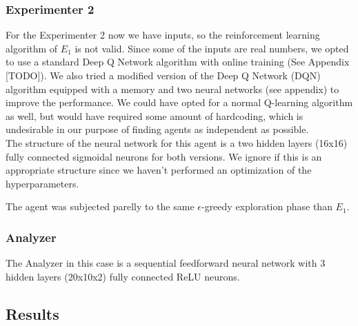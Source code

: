 \documentclass[11pt,a4paper,twoside]{report}
\newcommand{\+}{\textnormal{+} }
\theoremstyle{definition}
\numberwithin{equation}{chapter}
\begin{document}
\subsubsection{Experimenter 2}
For the Experimenter 2 now we have inputs, so the reinforcement learning
algorithm of $E_1$ is not valid. Since some of the inputs are real numbers, we
opted to use a standard Deep Q Network algorithm with online training (See
Appendix [TODO]). We also tried a modified version of the Deep Q Network (DQN)
algorithm equipped with a memory and two neural networks (see appendix) to
improve the performance. We could have opted for a normal Q-learning algorithm
as well, but would have required some amount of hardcoding, which is undesirable
in our purpose of finding agents as independent as possible. 
\\
\noindent The structure of the neural network for this agent is a two hidden layers  
(16x16) fully connected sigmoidal neurons for both versions. We ignore if this 
is an appropriate structure since we haven't performed an optimization of the
hyperparameters.

\noindent The agent was subjected parelly to the same $\epsilon$-greedy
exploration phase than $E_1$.

\subsubsection{Analyzer}

The Analyzer in this case is a sequential feedforward neural network with 
3 hidden layers (20x10x2) fully connected ReLU neurons.

\subsection{Results}



%
%
\end{document}
